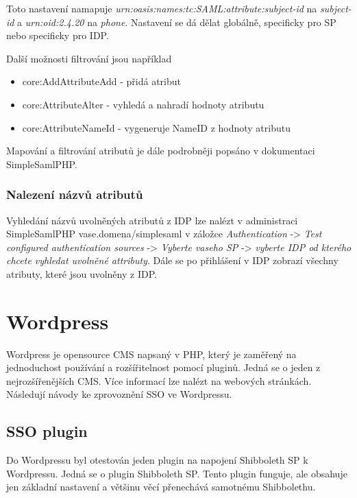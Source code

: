 Toto nastavení namapuje \emph{urn:oasis:names:tc:SAML:attribute:subject-id} na \emph{subject-id} a \emph{urn:oid:2.4.20} na \emph{phone}. Nastavení se dá dělat globálně, specificky pro SP nebo specificky pro IDP.

Další možnosti filtrování jsou například
\begin{itemize}
    \item core:AddAttributeAdd - přidá atribut
    \item core:AttributeAlter - vyhledá a nahradí hodnoty atributu
    \item core:AttributeNameId - vygeneruje NameID z hodnoty atributu
\end{itemize}

Mapování a filtrování atributů je dále podrobněji popsáno v dokumentaci SimpleSamlPHP. \cite{Authentication-Processing-Filters-in-SimpleSAMLphp}


\subsubsection{Nalezení názvů atributů} %
Vyhledání názvů uvolněných atributů z IDP lze nalézt v administraci SimpleSamlPHP vase.domena/simplesaml v záložce \emph{Authentication} -> \emph{Test configured authentication sources} -> \emph{Vyberte vaseho SP} -> \emph{vyberte IDP od kterého chcete vyhledat uvolněné attributy}. Dále se po přihlášení v IDP zobrazí všechny atributy, které jsou uvolněny z IDP.


\section{Wordpress} %

Wordpress je opensource CMS napsaný v PHP, který je zaměřený na jednoduchost používání a rozšířitelnost pomocí pluginů. Jedná se o jeden z nejrozšířenějších CMS. Více informací lze nalézt na webových stránkách\cite{wordpress}.
\\
Následují návody ke zprovoznění SSO ve Wordpressu.

\subsection{SSO plugin} %
Do Wordpressu byl otestován jeden plugin na napojení Shibboleth SP k Wordpressu. Jedná se o plugin Shibboleth SP\cite{ShibbolethSpWp}. Tento plugin funguje, ale obsahuje jen základní nastavení a většinu věcí přenechává samotnému Shibbolethu.

